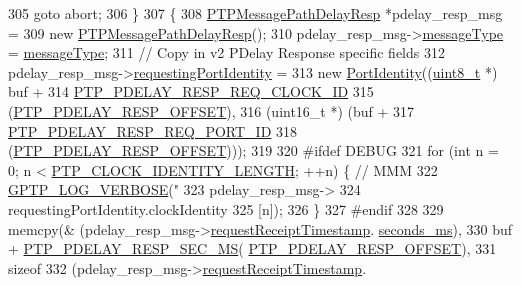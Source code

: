 \begin{DoxyCode}
{{{{{{{305             \textcolor{keywordflow}{goto} abort;
306         \}
307         \{
308             \hyperlink{class_p_t_p_message_path_delay_resp}{PTPMessagePathDelayResp} *pdelay\_resp\_msg =
309                 \textcolor{keyword}{new} \hyperlink{class_p_t_p_message_path_delay_resp}{PTPMessagePathDelayResp}();
310             pdelay\_resp\_msg->\hyperlink{class_p_t_p_message_common_adb32627aa5b0e2dbad3ccd88aab07c05}{messageType} = \hyperlink{class_p_t_p_message_common_adb32627aa5b0e2dbad3ccd88aab07c05}{messageType};
311             \textcolor{comment}{// Copy in v2 PDelay Response specific fields}
312             pdelay\_resp\_msg->\hyperlink{class_p_t_p_message_path_delay_resp_a27e69c7fb521ebffca13229a7c4658ce}{requestingPortIdentity} =
313                 \textcolor{keyword}{new} \hyperlink{class_port_identity}{PortIdentity}((\hyperlink{stdint_8h_aba7bc1797add20fe3efdf37ced1182c5}{uint8\_t} *) buf +
314                          \hyperlink{avbts__message_8hpp_a9c01e5eff56f505aca3f6f3deb6c34f1}{PTP\_PDELAY\_RESP\_REQ\_CLOCK\_ID}
315                          (\hyperlink{avbts__message_8hpp_a7c20f0e32d4408c124fa9e115ab32cf3}{PTP\_PDELAY\_RESP\_OFFSET}),
316                          (uint16\_t *) (buf +
317                                \hyperlink{avbts__message_8hpp_a1c5ac861894d1195aa57f60ef085798d}{PTP\_PDELAY\_RESP\_REQ\_PORT\_ID}
318                                (\hyperlink{avbts__message_8hpp_a7c20f0e32d4408c124fa9e115ab32cf3}{PTP\_PDELAY\_RESP\_OFFSET})));
319 
320 \textcolor{preprocessor}{#ifdef DEBUG}
321             \textcolor{keywordflow}{for} (\textcolor{keywordtype}{int} n = 0; n < \hyperlink{ptptypes_8hpp_afd1566058ed7927c2b790c9d4a0051ec}{PTP\_CLOCK\_IDENTITY\_LENGTH}; ++n) \{  \textcolor{comment}{// MMM}
322                 \hyperlink{gptp__log_8hpp_add03384a2a8099b27e07d041cce77e6f}{GPTP\_LOG\_VERBOSE}(\textcolor{stringliteral}{"%
323                     pdelay\_resp\_msg->
324                     requestingPortIdentity.clockIdentity
325                     [n]);
326             \}
327 \textcolor{preprocessor}{#endif}
328 
329             memcpy(& (pdelay\_resp\_msg->\hyperlink{class_p_t_p_message_path_delay_resp_a981c3fe148ecddf9f1091675650ccd48}{requestReceiptTimestamp}.
      \hyperlink{class_timestamp_a5d98378d782519e6f9c17db70f1620f0}{seconds\_ms}),
330                    buf + \hyperlink{avbts__message_8hpp_a5afc93370bc70d23f95f2acbe53749d8}{PTP\_PDELAY\_RESP\_SEC\_MS}(
      \hyperlink{avbts__message_8hpp_a7c20f0e32d4408c124fa9e115ab32cf3}{PTP\_PDELAY\_RESP\_OFFSET}),
331                    \textcolor{keyword}{sizeof}
332                    (pdelay\_resp\_msg->\hyperlink{class_p_t_p_message_path_delay_resp_a981c3fe148ecddf9f1091675650ccd48}{requestReceiptTimestamp}.
}}}}}}}}
\end{DoxyCode}
